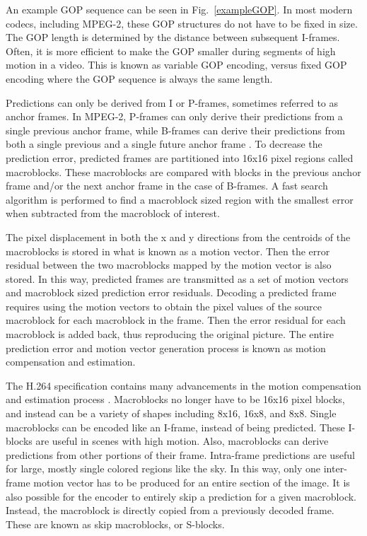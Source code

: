 An example GOP sequence can be seen in Fig.~\ref{exampleGOP}. In most modern codecs, including MPEG-2, these GOP structures do not have to be fixed in size. The GOP length is determined by the distance between subsequent I-frames. Often, it is more efficient to make the GOP smaller during segments of high motion in a video. This is known as variable GOP encoding, versus fixed GOP encoding where the GOP sequence is always the same length.

Predictions can only be derived from I or P-frames, sometimes referred to as anchor frames. In MPEG-2, P-frames can only derive their predictions from a single previous anchor frame, while B-frames can derive their predictions from both a single previous and a single future anchor frame \cite{mpeg2}. To decrease the prediction error, predicted frames are partitioned into 16x16 pixel regions called macroblocks. These macroblocks are compared with blocks in the previous anchor frame and/or the next anchor frame in the case of B-frames. A fast search algorithm is performed to find a macroblock sized region with the smallest error when subtracted from the macroblock of interest.

The pixel displacement in both the x and y directions from the centroids of the macroblocks is stored in what is known as a motion vector. Then the error residual between the two macroblocks mapped by the motion vector is also stored. In this way, predicted frames are transmitted as a set of motion vectors and macroblock sized prediction error residuals. Decoding a predicted frame requires using the motion vectors to obtain the pixel values of the source macroblock for each macroblock in the frame. Then the error residual for each macroblock is added back, thus reproducing the original picture. The entire prediction error and motion vector generation process is known as motion compensation and estimation.

The H.264 specification contains many advancements in the motion compensation and estimation process \cite{h264} \cite{h264Overview}. Macroblocks no longer have to be 16x16 pixel blocks, and instead can be a variety of shapes including 8x16, 16x8, and 8x8. Single macroblocks can be encoded like an I-frame, instead of being predicted. These I-blocks are useful in scenes with high motion. Also, macroblocks can derive predictions from other portions of their frame. Intra-frame predictions are useful for large, mostly single colored regions like the sky. In this way, only one inter-frame motion vector has to be produced for an entire section of the image. It is also possible for the encoder to entirely skip a prediction for a given macroblock. Instead, the macroblock is directly copied from a previously decoded frame. These are known as skip macroblocks, or S-blocks.

